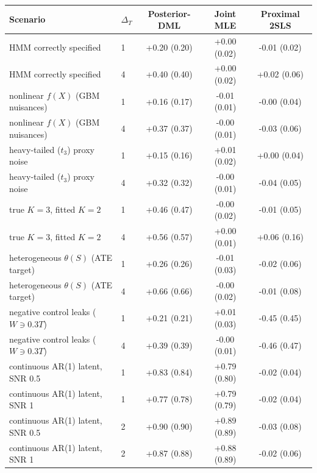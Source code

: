 \begin{tabular}{llccc}
\toprule
Scenario & $\Delta_T$ & Posterior-DML & Joint MLE & Proximal 2SLS \\
\midrule
HMM correctly specified & 1 & +0.20 (0.20) & +0.00 (0.02) & -0.01 (0.02) \\
HMM correctly specified & 4 & +0.40 (0.40) & +0.00 (0.02) & +0.02 (0.06) \\
nonlinear $f(X)$ (GBM nuisances) & 1 & +0.16 (0.17) & -0.01 (0.01) & -0.00 (0.04) \\
nonlinear $f(X)$ (GBM nuisances) & 4 & +0.37 (0.37) & -0.00 (0.01) & -0.03 (0.06) \\
heavy-tailed ($t_3$) proxy noise & 1 & +0.15 (0.16) & +0.01 (0.02) & +0.00 (0.04) \\
heavy-tailed ($t_3$) proxy noise & 4 & +0.32 (0.32) & -0.00 (0.01) & -0.04 (0.05) \\
true $K{=}3$, fitted $K{=}2$ & 1 & +0.46 (0.47) & -0.00 (0.02) & -0.01 (0.05) \\
true $K{=}3$, fitted $K{=}2$ & 4 & +0.56 (0.57) & +0.00 (0.01) & +0.06 (0.16) \\
heterogeneous $\theta(S)$ (ATE target) & 1 & +0.26 (0.26) & -0.01 (0.03) & -0.02 (0.06) \\
heterogeneous $\theta(S)$ (ATE target) & 4 & +0.66 (0.66) & -0.00 (0.02) & -0.01 (0.08) \\
negative control leaks ($W\ni0.3T$) & 1 & +0.21 (0.21) & +0.01 (0.03) & -0.45 (0.45) \\
negative control leaks ($W\ni0.3T$) & 4 & +0.39 (0.39) & -0.00 (0.01) & -0.46 (0.47) \\
continuous AR(1) latent, SNR 0.5 & 1 & +0.83 (0.84) & +0.79 (0.80) & -0.02 (0.04) \\
continuous AR(1) latent, SNR 1 & 1 & +0.77 (0.78) & +0.79 (0.79) & -0.02 (0.04) \\
continuous AR(1) latent, SNR 0.5 & 2 & +0.90 (0.90) & +0.89 (0.89) & -0.03 (0.08) \\
continuous AR(1) latent, SNR 1 & 2 & +0.87 (0.88) & +0.88 (0.89) & -0.02 (0.06) \\
\bottomrule
\end{tabular}
